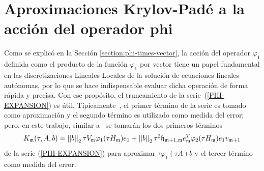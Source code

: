 \section{Aproximaciones Krylov-Padé a la acción del operador phi}\label{section:krylov-pade-approx}

Como se explicó en la Sección \ref{section:phi-times-vector}, la acción del operador $\varphi_1$ definida como el producto de la función $\varphi_1$ por vector tiene un papel fundamental en las discretizaciones Lineales Locales de la solución de ecuaciones lineales autónomas, por lo que se hace indispensable evaluar dicha operación de forma rápida y precisa. Con ese propósito, el truncamiento de la serie~(\ref{PHI-EXPANSION}) es útil. Típicamente~\cite{niesen2012algorithm,sidje1998expokit,tokman2006efficient}, el primer término de la serie es tomado como aproximación y el segundo término es utilizado como medida del error; pero, en este trabajo, similar a~\cite{Saad92} se tomarán los dos primeros términos
 \begin{equation}\label{exact-two-terms-km}
    K_{\mathfrak{m}}(\tau,A,b) = \left\lvert \left\lvert  b  \right\rvert \right\rvert_2\tau V_{\mathfrak{m}}\varphi_1(\tau H_{\mathfrak{m}})e_1 + \left\lvert \left\lvert  b  \right\rvert \right\rvert_2\tau^2\mathfrak{h}_{\mathfrak{m}+1,\mathfrak{m}}e^T_{\mathfrak{m}}\varphi_2(\tau H_{\mathfrak{m}})e_1v_{\mathfrak{m}+1}
 \end{equation}
de la serie (\ref{PHI-EXPANSION}) para aproximar $\tau\varphi_1(\tau A)b$ y el tercer término como medida del error.

